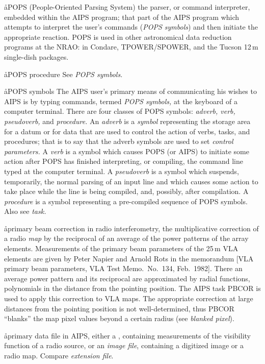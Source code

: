 \aa{POPS}
(People-Oriented Parsing System) the parser, or command
interpreter, embedded within the AIPS program; that part
of the AIPS program which attempts to interpret the user's
commands ({\it POPS symbols}\/) and then initiate the appropriate reaction.
POPS is used in other astronomical data reduction
programs at the NRAO: in Condare, TPOWER/SPOWER, and the
Tucson 12\,m single-dish packages.

\aa{POPS procedure} See {\it POPS symbols.}

\aa{POPS symbols}
The AIPS user's primary means of communicating his wishes
to AIPS is by typing commands,
termed {\it POPS symbols,} at the keyboard of a computer terminal.
There are four classes of POPS symbols: {\it adverb, verb,
pseudoverb,} and {\it procedure.}
An {\it adverb} is a {\it symbol} representing the storage area
for a datum or for data that are used to control the action of
verbs, tasks, and procedures; that is to say that the adverb symbols
are used to set {\sl control parameters.}
A {\it verb} is a symbol which causes POPS (or AIPS) to
initiate some action after POPS has finished interpreting,
or compiling, the command line typed at the computer terminal.
A {\it pseudoverb}
is a symbol which suspends, temporarily, the normal parsing
of an input line and which causes some action to take place
while the line is being compiled, and, possibly, after compilation.
A {\it procedure}
is a symbol representing a pre-compiled sequence of POPS symbols.
Also see {\it task.}

\aa{primary beam correction}
in radio interferometry, the multiplicative correction of a radio {\it map}
by the reciprocal of an average of the power patterns of the array elements.
Measurements of the primary beam parameters of the 25\,m VLA elements
are given by Peter Napier and Arnold Rots in the memorandum
[VLA primary beam parameters, VLA Test Memo.\ No.~134, Feb.~1982].
There an average power pattern and its reciprocal are approximated by radial
functions, polynomials in the distance from the pointing position.
The AIPS task PBCOR is used to apply this correction to VLA maps.
The appropriate correction at large distances from the pointing position
is not well-determined, thus
PBCOR ``blanks'' the map pixel values beyond a certain radius (see
{\it blanked pixel}\/).

\aa{primary data file}
in AIPS, either a , containing measurements of
the visibility function of a radio source, or an {\it image
file}, containing a digitized image or a radio map.
Compare {\it extension file}.

